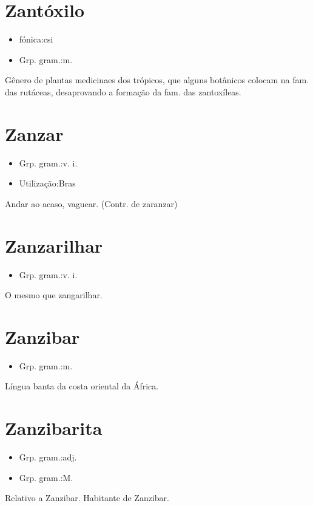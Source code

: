 \section{Zantóxilo}
\begin{itemize}
\item {fónica:csi}
\end{itemize}
\begin{itemize}
\item {Grp. gram.:m.}
\end{itemize}
Gênero de plantas medicinaes dos trópicos, que alguns botânicos colocam na fam. das rutáceas, desaprovando a formação da fam. das zantoxíleas.
\section{Zanzar}
\begin{itemize}
\item {Grp. gram.:v. i.}
\end{itemize}
\begin{itemize}
\item {Utilização:Bras}
\end{itemize}
Andar ao acaso, vaguear.
(Contr. de \textunderscore zaranzar\textunderscore )
\section{Zanzarilhar}
\begin{itemize}
\item {Grp. gram.:v. i.}
\end{itemize}
O mesmo que \textunderscore zangarilhar\textunderscore .
\section{Zanzibar}
\begin{itemize}
\item {Grp. gram.:m.}
\end{itemize}
Língua banta da costa oriental da África.
\section{Zanzibarita}
\begin{itemize}
\item {Grp. gram.:adj.}
\end{itemize}
\begin{itemize}
\item {Grp. gram.:M.}
\end{itemize}
Relativo a Zanzibar.
Habitante de Zanzibar.
